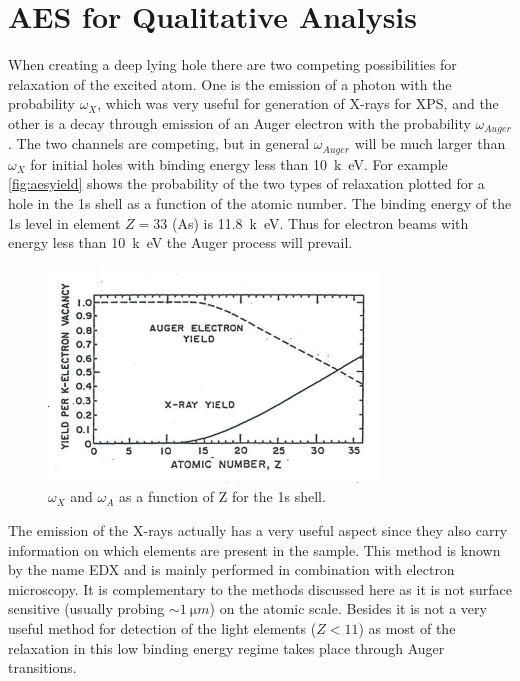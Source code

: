 \section{AES for Qualitative Analysis}
When creating a deep lying hole there are two competing possibilities for relaxation of the excited atom. One is the emission of a photon with the probability $\omega_{X}$, which was very useful for generation of X-rays for XPS, and the other is a decay through emission of an Auger electron with the probability $\omega_{Auger}$. The two channels are competing, but in general $\omega_{Auger}$ will be much larger than $\omega_{X}$ for initial holes with binding energy less than \SI{10}{k\electronvolt}. For example \autoref{fig:aesyield} shows the probability of the two types of  relaxation plotted for a hole in the 1s shell as a function of the atomic number. The binding energy of the 1s level in element $Z=33$ (As) is \SI{11.8}{k\electronvolt}. Thus for electron beams with energy less than \SI{10}{k\electronvolt} the Auger process will prevail.

\begin{figure}[h!]
	\begin{center}
	\includegraphics[scale=4]{figures/06_06.png}
	\caption{$\omega_{X}$ and $\omega_{A}$ as a function of Z for the 1s shell.}
	\label{fig:aesyield}
	\end{center}
\end{figure}

The emission of the X-rays actually has a  very useful aspect since they also carry information on which elements are present in the sample. This method is known by the name EDX and is mainly performed in combination with electron microscopy. It is complementary to the methods discussed here as it is not surface sensitive (usually probing $\sim \SI{1}{\micro m}$) on the atomic scale. Besides it is not a very useful method for detection of the light elements ($Z<11$) as most of the relaxation in this low binding energy regime takes place through Auger transitions.

